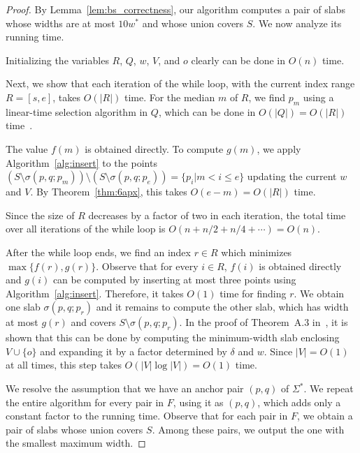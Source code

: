 \begin{proof}
    By Lemma~\ref{lem:bs_correctness}, our algorithm computes a pair of slabs whose widths are at most $10w^*$ and whose union covers $S$.
    We now analyze its running time.

    Initializing the variables $R$, $Q$, $w$, $V$, and $o$ clearly can be done in $O(n)$ time.

    Next, we show that each iteration of the while loop, with the current index range $R = [s, e]$, takes $O(|R|)$ time.
    For the median $m$ of $R$, we find $p_m$ using a linear-time selection algorithm in $Q$, which can be done in $O(|Q|)=O(|R|)$ time~\cite{Blum1973Time_selection}.

    The value $f(m)$ is obtained directly.
    To compute $g(m)$, we apply Algorithm~\ref{alg:insert} to the points $(S\setminus\sigma(p, q; p_m))\setminus (S\setminus\sigma(p, q; p_e))=\{p_i | m < i \le e \}$
    updating the current $w$ and $V$.
    By Theorem~\ref{thm:6apx}, this takes $O(e-m)=O(|R|)$ time.

    Since the size of $R$ decreases by a factor of two in each iteration, the total time over all iterations of the while loop is $O(n + n/2 + n/4 + \cdots) = O(n)$.

    After the while loop ends, we find an index $r\in R$ which minimizes $\max\{f(r), g(r)\}$.
    Observe that for every $i\in R$, $f(i)$ is obtained directly and $g(i)$ can be computed by inserting at most three points using Algorithm~\ref{alg:insert}. 
    Therefore, it takes $O(1)$ time for finding $r$. 
    We obtain one slab $\sigma(p, q;p_r)$ and it remains to compute the other slab, which has width at most $g(r)$ and covers $S \setminus \sigma(p,q;p_r)$.
    In the proof of Theorem~A.3 in~\cite{chan2006faster}, it is shown that this can be done by  computing the minimum-width slab enclosing $V\cup \{ o\}$ and expanding it by a factor determined by $\delta$ and $w$.
    Since $|V|=O(1)$ at all times, this step takes $O(|V|\log |V|)=O(1)$ time.

    We resolve the assumption that we have an anchor pair $(p, q)$ of $\Sigma^*$. We repeat the entire algorithm for every pair in $F$, using it as $(p, q)$, which adds only a constant factor to the running time.
    Observe that for each pair in $F$, we obtain a pair of slabs whose union covers $S$. 
    Among these pairs, we output the one with the smallest maximum width.  
\end{proof}







